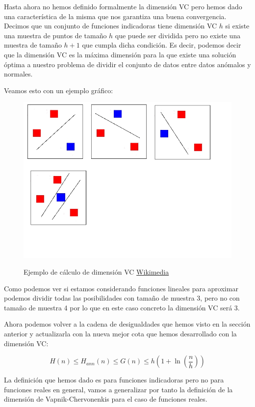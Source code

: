 Hasta ahora no hemos definido formalmente la dimensión VC pero hemos dado una característica de la misma que nos garantiza una buena convergencia. Decimos que un conjunto de funciones indicadoras tiene dimensión VC $h$ si existe una muestra de puntos de tamaño $h$ que puede ser dividida pero no existe una muestra de tamaño $h+1$ que cumpla dicha condición. Es decir, podemos decir que la dimensión VC es la máxima dimensión para la que existe una solución óptima a nuestro problema de dividir el conjunto de datos entre datos anómalos y normales.

Veamos esto con un ejemplo gráfico:

\begin{figure}[H]
	\centering
	\includegraphics[scale=0.35]{imagenes/dimension_vc}
	\label{dimension_vc}
	\caption{Ejemplo de cálculo de dimensión VC \href{https://commons.wikimedia.org/wiki/File:Vc_linear.jpg}{Wikimedia}}
\end{figure}

Como podemos ver si estamos considerando funciones lineales para aproximar podemos dividir todas las posibilidades con tamaño de muestra 3, pero no con tamaño de muestra 4 por lo que en este caso concreto la dimensión VC será 3.

Ahora podemos volver a la cadena de desigualdades que hemos visto en la sección anterior y actualizarla con la nueva mejor cota que hemos desarrollado con la dimensión VC:

$$H(n)\leq H_{ann}(n) \leq G(n) \leq h(1+\ln (\frac{n}{h}))$$

La definición que hemos dado es para funciones indicadoras pero no para funciones reales en general, vamos a generalizar por tanto la definición de la dimensión de Vapnik-Chervonenkis para el caso de funciones reales.

